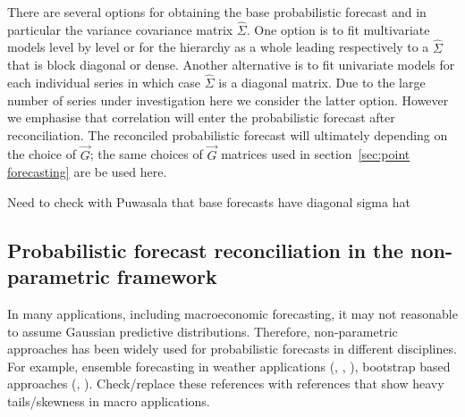 \documentclass[graybox]{svmult}
\begin{document}
There are several options for obtaining the base probabilistic forecast and in particular the variance covariance matrix $\hat{\Sigma}$.  One option is to fit multivariate models level by level or for the hierarchy as a whole leading respectively to a $\hat{\Sigma}$ that is block diagonal or dense.  Another alternative is to fit univariate models for each individual series in which case $\hat{\Sigma}$ is a diagonal matrix. Due to the large number of series under investigation here we consider the latter option.  However we emphasise that correlation will enter the probabilistic forecast after reconciliation.  The reconciled probabilistic forecast will ultimately depending on the choice of $\vec{G}$; the same choices of $\vec{G}$ matrices used in section~\ref{sec:point forecasting} are be used here.

{\color{red} Need to check with Puwasala that base forecasts have diagonal sigma hat}

\subsection{Probabilistic forecast reconciliation in the non-parametric framework}

In many applications, including macroeconomic forecasting, it may not reasonable to assume Gaussian predictive distributions. Therefore, non-parametric approaches has been widely used for probabilistic forecasts in different disciplines. For example, ensemble forecasting in weather applications (\cite{Gneiting2005}, \cite{Gneiting2014}, \cite{Gneiting2008}), bootstrap based approaches (\cite{Manzan2008}, \cite{Vilar2013}). {\color{red} Check/replace these references with references that show heavy tails/skewness in macro applications.}

\end{document}
